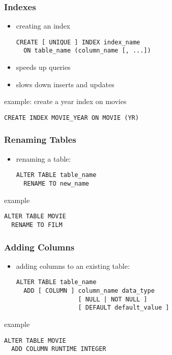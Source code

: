 \documentclass[dvipsnames]{beamer}
\theoremstyle{plain}
\begin{document}
\begin{frame}[fragile]
  \frametitle{Indexes}

  \begin{itemize}
    \item creating an index
    \begin{lstlisting}
CREATE [ UNIQUE ] INDEX index_name
  ON table_name (column_name [, ...])
    \end{lstlisting}

    \smallskip
    \item speeds up queries
    \item slows down inserts and updates
  \end{itemize}

  \begin{exampleblock}{example: create a year index on movies}
    \begin{lstlisting}
CREATE INDEX MOVIE_YEAR ON MOVIE (YR)
    \end{lstlisting}
  \end{exampleblock}
\end{frame}

\begin{frame}[fragile]
  \frametitle{Renaming Tables}

  \begin{itemize}
    \item renaming a table:
    \begin{lstlisting}
ALTER TABLE table_name
  RENAME TO new_name
    \end{lstlisting}
  \end{itemize}

  \medskip
  \begin{exampleblock}{example}
    \begin{lstlisting}
ALTER TABLE MOVIE
  RENAME TO FILM
    \end{lstlisting}
  \end{exampleblock}
\end{frame}

\begin{frame}[fragile]
  \frametitle{Adding Columns}

  \begin{itemize}
    \item adding columns to an existing table:
    \begin{lstlisting}
ALTER TABLE table_name
  ADD [ COLUMN ] column_name data_type
                 [ NULL | NOT NULL ]
                 [ DEFAULT default_value ]
    \end{lstlisting}
  \end{itemize}

  \medskip
  \begin{exampleblock}{example}
    \begin{lstlisting}
ALTER TABLE MOVIE
  ADD COLUMN RUNTIME INTEGER
    \end{lstlisting}
  \end{exampleblock}
\end{frame}
\end{document}
